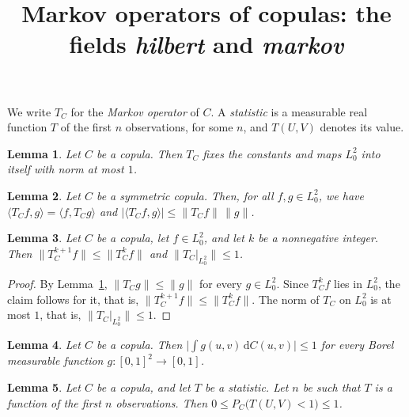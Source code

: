 \documentclass{article}
\title{Markov operators of copulas: the fields \emph{hilbert} and \emph{markov}}
\newtheorem{lemma}{Lemma}
\newcommand{\de}{\,\mathrm{d}}
\begin{document}
\maketitle

We write $T_C$ for the \emph{Markov operator} of $C$.
A \emph{statistic} is a measurable real function $T$ of the first $n$ observations, for some $n$, and $T(U,V)$ denotes its value.

\begin{lemma}\label{lem:contraction}
Let $C$ be a copula.
Then $T_C$ fixes the constants and maps $L^2_0$ into itself with norm at most $1$.
\end{lemma}

\begin{lemma}\label{lem:inner}
Let $C$ be a symmetric copula.
Then, for all $f,g\in L^2_0$, we have $\langle T_Cf,g\rangle=\langle f,T_Cg\rangle$ and $\lvert\langle T_Cf,g\rangle\rvert\le\lVert T_Cf\rVert\,\lVert g\rVert$.
\end{lemma}

\begin{lemma}\label{lem:powers}
Let $C$ be a copula, let $f\in L^2_0$, and let $k$ be a nonnegative integer.
Then $\lVert T_C^{k+1}f\rVert\le\lVert T_C^kf\rVert$ and $\lVert T_C|_{L^2_0}\rVert\le1$.
\end{lemma}

\begin{proof}
By Lemma~\ref{lem:contraction}, $\lVert T_Cg\rVert\le\lVert g\rVert$ for every $g\in L^2_0$.
Since $T_C^kf$ lies in $L^2_0$, the claim follows for it, that is, $\lVert T_C^{k+1}f\rVert\le\lVert T_C^kf\rVert$.
The norm of $T_C$ on $L^2_0$ is at most $1$, that is, $\lVert T_C|_{L^2_0}\rVert\le1$.
\end{proof}

\begin{lemma}\label{lem:bounded}
Let $C$ be a copula.
Then $\bigl|\int g(u,v)\de C(u,v)\bigr|\le1$ for every Borel measurable function $g:[0,1]^2\to[0,1]$.
\end{lemma}

\begin{lemma}\label{lem:events}
Let $C$ be a copula, and let $T$ be a statistic.
Let $n$ be such that $T$ is a function of the first $n$ observations.
Then $0\le P_C\bigl(T(U,V)<1\bigr)\le1$.
\end{lemma}
\end{document}
